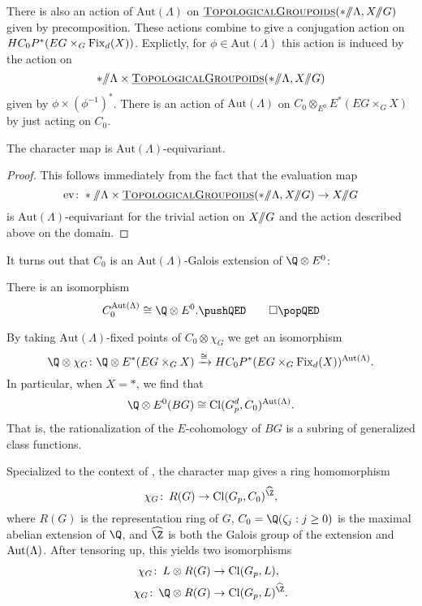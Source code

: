 There is also an action of \(\mathrm{Aut}(\Lambda)\) on \(\operatorname{\underline{\smash{\normalfont\textsc{TopologicalGroupoids}}}}(* /\!\!/ \Lambda, X /\!\!/ G)\) given by precomposition. These actions combine to give a conjugation action on \(HC_{0}P^{*}(EG \times_G \operatorname{Fix}_d(X))\). Explictly, for \(\phi \in \mathrm{Aut}(\Lambda)\) this action is induced by the action on 
\[
* /\!\!/ \Lambda \times \operatorname{\underline{\smash{\normalfont\textsc{TopologicalGroupoids}}}}(* /\!\!/ \Lambda, X /\!\!/ G)
\]
given by \(\phi \times (\phi^{-1})^*\). There is an action of \(\mathrm{Aut}(\Lambda)\) on \(C_0 \otimes_{E^0} E^*(EG \times_G X)\) by just acting on \(C_0\).



\begin{proposition}
The character map is \(\mathrm{Aut}(\Lambda)\)-equivariant.
\end{proposition}
\begin{proof}
This follows immediately from the fact that the evaluation map
\[
\mathrm{ev} \colon * \mmod \Lambda \times \InternalHom{TopologicalGroupoids}(* \mmod \Lambda, X \mmod G) \to X \mmod G
\]
is \(\mathrm{Aut}(\Lambda)\)-equivariant for the trivial action on \(X /\!\!/ G\) and the action described above on the domain.
\end{proof}

It turns out that \(C_0\) is an \(\mathrm{Aut}(\Lambda)\)-Galois extension of \(\Q \otimes E^0\):
\begin{proposition}
There is an isomorphism
\[
C_{0}^{\mathrm{Aut}(\Lambda)} \cong \Q \otimes E^0. \pushQED\qed \qedhere \popQED
\]
\end{proposition}

By taking \(\mathrm{Aut}(\Lambda)\)-fixed points of \(C_0 \otimes \chi_G\) we get an isomorphism
\[
\Q \otimes \chi_G \colon \Q \otimes E^*(EG \times_G X) \xrightarrow{\cong} HC_{0}P^{*}(EG \times_G \Fix_d(X))^{\mathrm{Aut}(\Lambda)}.
\]
In particular, when \(X = *\), we find that
\[
\Q \otimes E^0(BG) \cong \mathrm{Cl}(G_{p}^{d}, C_0)^{\mathrm{Aut}(\Lambda)}.
\]
That is, the rationalization of the \(E\)-cohomology of \(BG\) is a subring of generalized class functions.

\begin{example}
Specialized to the context of , the character map gives a ring homomorphism \[\chi_G\co R(G) \to \mathrm{Cl}(G_p, C_0)^{\widehat{\Z}},\] where \(R(G)\) is the representation ring of \(G\), \(C_0 = \Q(\zeta_j : j \ge 0)\) is the maximal abelian extension of \(\Q\), and \(\widehat{\Z}\) is both the Galois group of the extension and \(\operatorname{Aut}(\Lambda)\).  After tensoring up, this yields two isomorphisms
\begin{align*}
\chi_G\co L \otimes R(G) & \to \mathrm{Cl}(G_p, L), \\
\chi_G\co \Q \otimes R(G) & \to \mathrm{Cl}(G_p, L)^{\widehat{\Z}}.
\end{align*}
\end{example}
